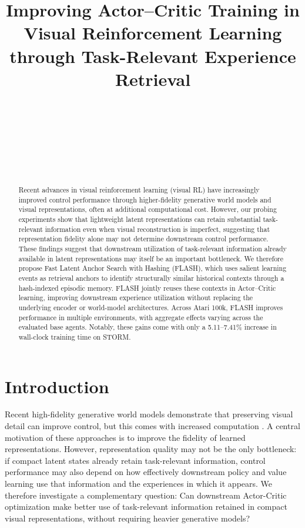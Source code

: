 \documentclass{article} %
\title{Improving Actor–Critic Training in Visual Reinforcement Learning through Task-Relevant Experience Retrieval}
\author{\todo{Author 1 Name} \\
\todo{Author 1 Affiliation} \\
\texttt{\todo{Author 1 Email}} \\
\And
\todo{Author 2 Name} \\
\todo{Author 2 Affiliation} \\
\texttt{\todo{Author 2 Email}} \\
}
\begin{document}
\maketitle

\begin{abstract}
Recent advances in visual reinforcement learning (visual RL) have increasingly improved control performance through higher-fidelity generative world models and visual representations, often at additional computational cost. However, our probing experiments show that lightweight latent representations can retain substantial task-relevant information even when visual reconstruction is imperfect, suggesting that representation fidelity alone may not determine downstream control performance. These findings suggest that downstream utilization of task-relevant information already available in latent representations may itself be an important bottleneck. We therefore propose Fast Latent Anchor Search with Hashing (FLASH), which uses salient learning events as retrieval anchors to identify structurally similar historical contexts through a hash-indexed episodic memory. FLASH jointly reuses these contexts in Actor--Critic learning, improving downstream experience utilization without replacing the underlying encoder or world-model architectures. Across Atari 100k, FLASH improves performance in multiple environments, with aggregate effects varying across the evaluated base agents. Notably, these gains come with only a 5.11--7.41\% increase in wall-clock training time on STORM.

\end{abstract}

\section{Introduction}
\label{sec:intro}

Recent high-fidelity generative world models demonstrate that preserving visual detail can improve control, but this comes with increased computation \citep{lee2026edeline, alonso2024diffusion}. A central motivation of these approaches is to improve the fidelity of learned representations. However, representation quality may not be the only bottleneck: if compact latent states already retain task-relevant information, control performance may also depend on how effectively downstream policy and value learning use that information and the experiences in which it appears. We therefore investigate a complementary question: Can downstream Actor-Critic optimization make better use of task-relevant information retained in compact visual representations, without requiring heavier generative models?
\end{document}
